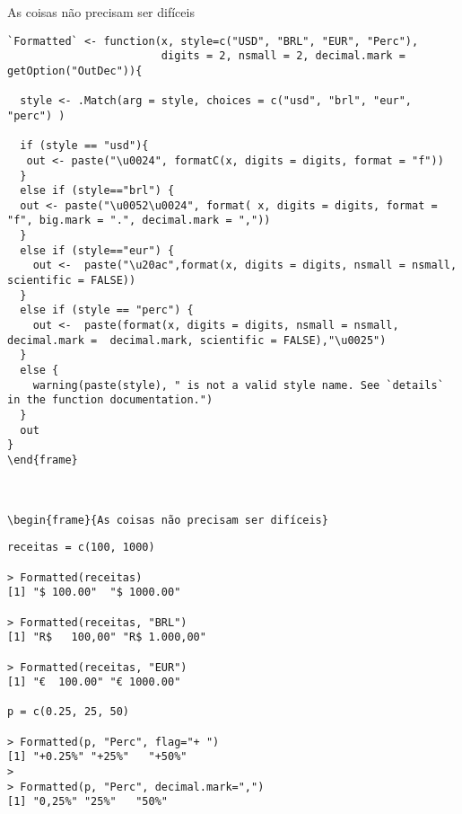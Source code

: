 \begin{frame}{As coisas não precisam ser difíceis}

\begin{lstlisting}
`Formatted` <- function(x, style=c("USD", "BRL", "EUR", "Perc"),
                        digits = 2, nsmall = 2, decimal.mark = getOption("OutDec")){

  style <- .Match(arg = style, choices = c("usd", "brl", "eur", "perc") )

  if (style == "usd"){
   out <- paste("\u0024", formatC(x, digits = digits, format = "f"))
  }
  else if (style=="brl") {
  out <- paste("\u0052\u0024", format( x, digits = digits, format = "f", big.mark = ".", decimal.mark = ","))
  }
  else if (style=="eur") {
    out <-  paste("\u20ac",format(x, digits = digits, nsmall = nsmall, scientific = FALSE))
  }
  else if (style == "perc") {
    out <-  paste(format(x, digits = digits, nsmall = nsmall, decimal.mark =  decimal.mark, scientific = FALSE),"\u0025")
  }
  else {
    warning(paste(style), " is not a valid style name. See `details` in the function documentation.")
  }
  out
}
\end{frame}



\begin{frame}{As coisas não precisam ser difíceis}	
\end{lstlisting}

\begin{lstlisting}
receitas = c(100, 1000)

> Formatted(receitas)
[1] "$ 100.00"  "$ 1000.00"

> Formatted(receitas, "BRL")
[1] "R$   100,00" "R$ 1.000,00"

> Formatted(receitas, "EUR")
[1] "€  100.00" "€ 1000.00"

p = c(0.25, 25, 50)

> Formatted(p, "Perc", flag="+ ")
[1] "+0.25%" "+25%"   "+50%"  
> 
> Formatted(p, "Perc", decimal.mark=",")
[1] "0,25%" "25%"   "50%"

\end{lstlisting}

\end{frame}